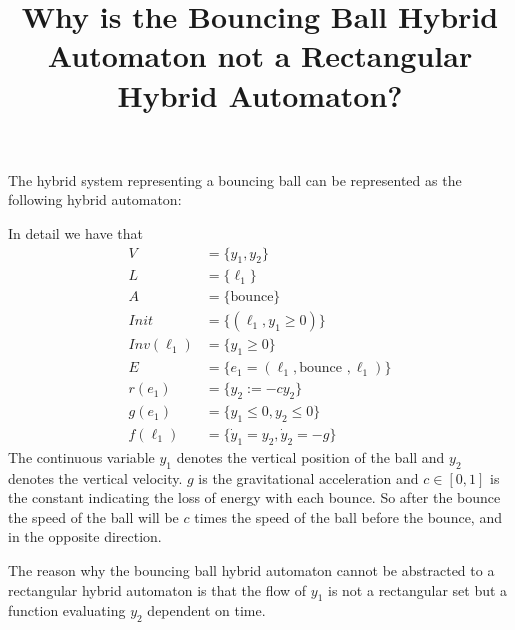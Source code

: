 \documentclass{amsart}
\title{Why is the Bouncing Ball Hybrid Automaton not a Rectangular Hybrid Automaton?}
\begin{document}
\maketitle
The hybrid system representing a bouncing ball can be represented as the following hybrid automaton:
\begin{figure}[H]
    \begin{center}
    \end{center}
\end{figure}
In detail we have that
\begin{align*}
    V & =\{y_{1},y_{2}\} \\
    L & =\{\ell_{1}\} \\
    A & =\{\text{bounce}\} \\
    Init & =\{(\ell_{1},y_{1}\geq0)\} \\
    Inv(\ell_{1}) & =\{y_{1}\geq 0\} \\
    E & =\{e_{1}=(\ell_{1},\text{bounce },\ell_{1})\}  \\
    r(e_{1}) & = \{y_{2}:=-cy_{2}\} \\
    g(e_{1}) & = \{y_{1}\leq0,y_{2}\leq0\} \\
    f(\ell_{1}) & =\{\dot{y}_{1}=y_{2},\dot{y}_{2}=-g\}
\end{align*}
The continuous variable $y_{1}$ denotes the vertical position of the ball and $y_{2}$ denotes the vertical velocity. $g$ is the gravitational acceleration and $c\in[0,1]$ is the constant indicating the loss of energy with each bounce. So after the bounce the speed of the ball will be $c$ times the speed of the ball before the bounce, and in the opposite direction.

The reason why the bouncing ball hybrid automaton cannot be abstracted to a rectangular hybrid automaton is that the flow of $y_{1}$ is not a rectangular set but a function evaluating $y_{2}$ dependent on time.
\end{document}
